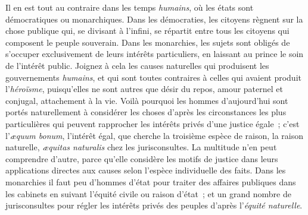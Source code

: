 \documentclass[french,twoside]{book} %
\begin{document}
Il en est tout au contraire dans les temps {\itshape humains}, où les états sont démocratiques ou monarchiques. Dans les démocraties, les citoyens règnent sur la chose publique qui, se divisant à l’infini, se répartit entre tous les citoyens qui composent le peuple souverain. Dans les monarchies, les sujets sont obligés de s’occuper exclusivement de leurs  intérêts particuliers, en laissant au prince le soin de l’intérêt public. Joignez à cela les causes naturelles qui produisent les gouvernements {\itshape humains}, et qui sont toutes contraires à celles qui avaient produit l’{\itshape héroïsme}, puisqu’elles ne sont autres que désir du repos, amour paternel et conjugal, attachement à la vie. Voilà pourquoi les hommes d’aujourd’hui sont portés naturellement à considérer les choses d’après les circonstances les plus particulières qui peuvent rapprocher les intérêts privés d’une justice égale ; c’est l’{\itshape æquum bonum}, l’intérêt égal, que cherche la troisième espèce de raison, la raison naturelle, {\itshape æquitas naturalis} chez les jurisconsultes. La multitude n’en peut comprendre d’autre, parce qu’elle considère les motifs de justice dans leurs applications directes aux causes selon l’espèce individuelle des faits. Dans les monarchies il faut peu d’hommes d’état pour traiter des affaires publiques dans les cabinets en suivant l’équité civile ou raison d’état ; et un grand nombre de jurisconsultes pour régler les intérêts privés des peuples d’après l’{\itshape équité naturelle}.
\end{document}
